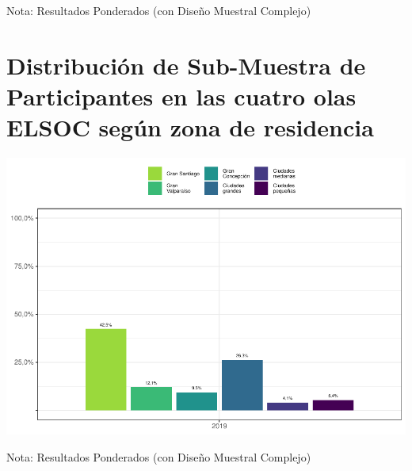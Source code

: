 \documentclass[
  12pt,
]{book}
\begin{document}
Nota: Resultados Ponderados (con Diseño Muestral Complejo)

\hypertarget{distribuciuxf3n-de-sub-muestra-de-participantes-en-las-cuatro-olas-elsoc-seguxfan-zona-de-residencia}{%
\section{Distribución de Sub-Muestra de Participantes en las cuatro olas ELSOC según zona de residencia}\label{distribuciuxf3n-de-sub-muestra-de-participantes-en-las-cuatro-olas-elsoc-seguxfan-zona-de-residencia}}

\begin{center}\includegraphics[width=0.75\linewidth]{concepto-medicion_files/figure-latex/unnamed-chunk-19-1} \end{center}

Nota: Resultados Ponderados (con Diseño Muestral Complejo)

  
\end{document}
